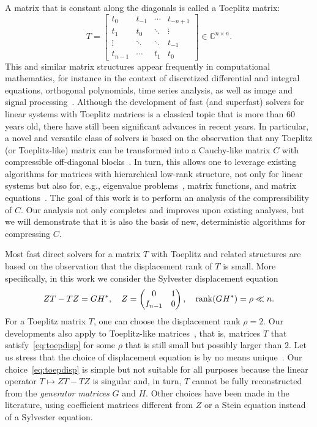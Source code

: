 \documentclass[final,reqno,onefignum,onetabnum]{siamart190516}
\newcommand{\C}{\mathbb{C}}
\newcommand{ \rank}{{\rm rank}}
\begin{document}
A matrix that is constant along the diagonals is called a Toeplitz matrix:
\[
 T = \begin{bmatrix}
      t_0 & t_{-1} & \cdots & t_{-n+1} \\
      t_1 & t_0 & \ddots & \vdots  \\
      \vdots & \ddots & \ddots & t_{-1} \\
      t_{n-1} & \cdots & t_1 & t_0
     \end{bmatrix} \in \C^{n\times n}.
\]
This and similar matrix structures appear frequently in computational mathematics, for instance in the context of discretized differential and integral equations, orthogonal polynomials, time series analysis, as well as image and signal processing~\cite{antoulas2005approximation, grenander1958toeplitz, gray2006toeplitz, heinig2013algebraic, kailath1995displacement, pan2012structured}. Although the development of fast (and superfast) solvers for linear systems with Toeplitz matrices is a classical topic that is more than $60$ years old, %
there have still been significant advances in recent years. In particular, a novel and versatile class of solvers is based on the observation that any Toeplitz (or Toeplitz-like) matrix can be transformed into a Cauchy-like matrix $C$ with compressible off-diagonal blocks~\cite{chandrasekaran2007superfast, martinsson2005fast, xia2012superfast}. In turn, this allows one to leverage existing algorithms for matrices with hierarchical low-rank structure, not only for linear systems but also for, e.g., eigenvalue problems~\cite{Ou2022}, matrix functions, and matrix equations~\cite{KMR2019}.
The goal of this work is to perform an analysis of the compressibility of $C$.
Our analysis not only completes and improves upon existing analyses, but we will demonstrate that it is also the basis of new, deterministic algorithms for compressing $C$. 


Most fast direct solvers for a matrix $T$ with Toeplitz and related structures are based on the observation that the displacement rank of $T$ is small. More specifically, in this work we consider the Sylvester displacement equation
\begin{equation} 
\label{eq:toepdisp}
Z T -TZ = GH^*, \quad Z = \begin{pmatrix} 0 & 1 \\ I_{n-1} & 0 \end{pmatrix}, \quad\rank({G}{H}^*) = \rho \ll n. 
\end{equation}
For a Toeplitz matrix $T$, one can choose the displacement rank $\rho=2$. 
Our developments also apply to Toeplitz-like matrices~\cite{kailath1995displacement,pan2012structured}, that is, matrices $T$ that satisfy~\eqref{eq:toepdisp} for some $\rho$ that is still small but possibly larger than $2$. Let us stress that the choice of displacement equation is by no means unique~\cite{kailath1995displacement}.
Our choice~\eqref{eq:toepdisp} is simple but not suitable for all purposes because the linear operator $T\mapsto Z T -TZ$ is singular and, in turn, $T$ cannot be fully reconstructed from the  \textit{generator matrices} $G$ and $H$. Other choices have been made in the literature, using coefficient matrices different from $Z$ or a Stein equation instead of a Sylvester equation.
\end{document}
